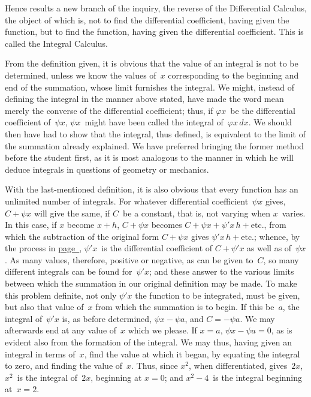\documentclass[12pt]{book}[2005/09/16]
\newcommand{\Pagelabel}[1]{\phantomsection\label{page:#1}}
\newcommand{\PageSep}[1]{\Pagelabel{#1}\ignorespaces}
\newcommand{\PageRef}[2][page]{\hyperref[page:#2]{#1~\pageref*{page:#2}}}
\renewcommand{\etc}{\text{etc}}
\renewcommand{\(}{{\upshape(}}
\renewcommand{\)}{{\upshape)}}
\renewcommand{\phi}{\varphi}
\begin{document}
Hence results a new branch of the inquiry, the reverse
of the Differential Calculus, the object of which
is, not to find the differential coefficient, having given
the function, but to find the function, having given
the differential coefficient. This is called the Integral
Calculus.

From the definition given, it is obvious that the
value of an integral is not to be determined, unless
we know the values of~$x$ corresponding to the beginning
and end of the summation, whose limit furnishes
the integral. We might, instead of defining the integral
in the manner above stated, have made the
word mean merely the converse of the differential coefficient;
thus, if $\phi x$~be the differential coefficient of~$\psi x$,
$\psi x$~might have been called the integral of~$\phi x\, dx$.
We should then have had to show that the integral,
thus defined, is equivalent to the limit of the summation
already explained. We have preferred bringing
the former method before the student first, as it is
most analogous to the manner in which he will deduce
integrals in questions of geometry or mechanics.
%

With the last-mentioned definition, it is also obvious
that every function has an unlimited number of
integrals. For whatever differential coefficient~$\psi x$
\PageSep{123}
gives, $C + \psi x$ will give the same, if $C$~be a constant,
that is, not varying when $x$~varies. In this case, if $x$
become $x + h$, $C + \psi x$ becomes $C + \psi x + \psi' x\, h + \etc.$,
from which the subtraction of the original form $C + \psi x$
gives $\psi' x\, h + \etc.$; whence, by the process in \PageRef{23},
$\psi' x$~is the differential coefficient of $C + \psi' x$ as well as
of~$\psi x$. As many values, therefore, positive or negative,
as can be given to~$C$, so many different integrals
%
can be found for~$\psi' x$; and these answer to the various
limits between which the summation in our original
definition may be made. To make this problem definite,
not only $\psi' x$ the function to be integrated, must
be given, but also that value of~$x$ from which the summation
is to begin. If this be~$a$, the integral of~$\psi' x$ is,
as before determined, $\psi x - \psi a$, and $C = -\psi a$. We
may afterwards end at any value of~$x$ which we please.
If $x = a$, $\psi x - \psi a = 0$, as is evident also from the
formation of the integral. We may thus, having given
an integral in terms of~$x$, find the value at which it
began, by equating the integral to zero, and finding
the value of~$x$. Thus, since $x^{2}$, when differentiated,
gives~$2x$, $x^{2}$~is the integral of~$2x$, beginning at $x = 0$;
and $x^{2} - 4$~is the integral beginning at~$x = 2$.
\end{document}
